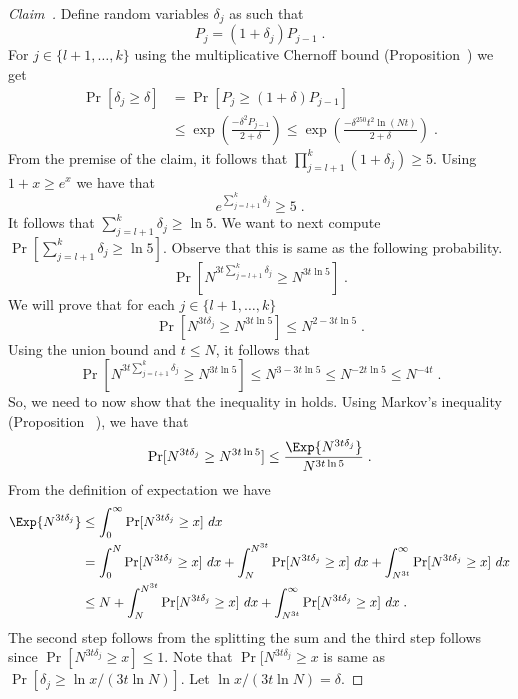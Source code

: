 \begin{proof}[Claim~]
    Define random variables $\delta_j$ as such that 
    \[
    P_{j}=(1+\delta_j)P_{j-1}\;.    
    \]
    For $j\in \{l+1,\ldots,k\}$ using the multiplicative Chernoff bound (Proposition~) we get
    \begin{align}\label{eq:delta}
    \Pr[\delta_j\geq \delta]& =\Pr[P_{j}\geq (1+\delta)P_{j-1}]\nonumber\\&\leq \exp\left(\frac{-\delta^2P_{j-1}}{2+\delta}\right)\leq \exp\left(\frac{-\delta^250t^2\ln (Nt)}{2+\delta}\right)\;.
    \end{align}
    From the premise of the claim, it follows that $\prod_{j=l+1}^k(1+\delta_j)\geq 5$. Using $1+x\geq e^x$ we have that 
    \[
    e^{\sum_{j=l+1}^k\delta_j}\geq 5\;.
    \]
    It follows that 
    $\sum_{j=l+1}^k\delta_j\geq \ln 5$.
    We want to next compute $\Pr[\sum_{j=l+1}^k\delta_j\geq \ln 5]$. Observe that this is same as the following probability.
    \[
        \Pr[N^{3t\sum_{j=l+1}^k\delta_j}\geq N^{3t\ln 5}]\;.
    \]
    We will prove that for each $j\in \{l+1,\ldots,k\}$ 
    \begin{equation}\label{eq:ineq}
        \Pr[N^{3t\delta_j}\geq N^{3t\ln 5}]\leq N^{2-3t\ln 5}\;.
    \end{equation}
    Using the union bound and $t\leq N$, it follows that 
    \[
        \Pr[N^{3t\sum_{j=l+1}^k\delta_j}\geq N^{3t\ln 5}]\leq N^{3-3t\ln 5}\leq N^{-2t\ln 5}\leq N^{-4t}\;.
    \]
    So, we need to now show that the inequality in  holds.
    Using Markov's inequality (Proposition ~), we have that 
    \begin{equation}\label{eq:second}
        \Pr[N^{3t\delta_j}\geq N^{3t\ln 5}]\leq \frac{\Exp{N^{3t\delta_j}}}{N^{3t\ln 5}}\;.
    \end{equation}
    From the definition of expectation we have
    \begin{align}
        \Exp{N^{3t\delta_j}}&\leq \int_0^\infty \Pr[N^{3t\delta_j}\geq x]~dx \nonumber\\
        &= \int_0^{N} \Pr[N^{3t\delta_j}\geq x]~dx+\int_N^{N^{3t}} \Pr[N^{3t\delta_j}\geq x]~dx +\int_{N^{3t}}^\infty \Pr[N^{3t\delta_j}\geq x]~dx \nonumber\\
        &\leq N+\int_N^{N^{3t}} \Pr[N^{3t\delta_j}\geq x]~dx +\int_{N^{3t}}^\infty \Pr[N^{3t\delta_j}\geq x]~dx\;.\label{eq:exp}
    \end{align}
    The second step follows from the splitting the sum and the third step follows since $\Pr[N^{3t\delta_j}\geq x]\leq 1$.
    Note that $\Pr[N^{3t\delta_j}\geq x$ is same as $\Pr[\delta_j\geq \ln x/(3t\ln N)]$. Let $\ln x/(3t\ln N)=\delta$.
    

\end{proof}

